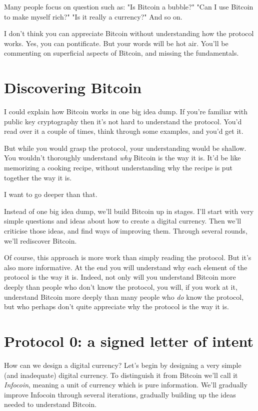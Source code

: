 Many people focus on question such as: "Is Bitcoin a bubble?"  "Can I
use Bitcoin to make myself rich?"  "Is it really a currency?" And so
on.

I don't think you can appreciate Bitcoin without understanding how the
protocol works.  Yes, you can pontificate.  But your words will be hot
air.  You'll be commenting on superficial aspects of Bitcoin, and
missing the fundamentals.

\section{Discovering Bitcoin}

I could explain how Bitcoin works in one big idea dump.  If you're
familiar with public key cryptography then it's not hard to understand
the protocol.  You'd read over it a couple of times, think through
some examples, and you'd get it.

But while you would grasp the protocol, your understanding would be
shallow.  You wouldn't thoroughly understand \emph{why} Bitcoin is the
way it is.  It'd be like memorizing a cooking recipe, without
understanding why the recipe is put together the way it is.

I want to go deeper than that.

Instead of one big idea dump, we'll build Bitcoin up in stages.  I'll
start with very simple questions and ideas about how to create a
digital currency.  Then we'll criticise those ideas, and find ways of
improving them.  Through several rounds, we'll rediscover Bitcoin.

Of course, this approach is more work than simply reading the
protocol.  But it's also more informative.  At the end you will
understand why each element of the protocol is the way it is.  Indeed,
not only will you understand Bitcoin more deeply than people who don't
know the protocol, you will, if you work at it, understand Bitcoin
more deeply than many people who \emph{do} know the protocol, but who
perhaps don't quite appreciate why the protocol is the way it is.

\section{Protocol 0: a signed letter of intent}

How can we design a digital currency?  Let's begin by designing a very
simple (and inadequate) digital currency.  To distinguish it from
Bitcoin we'll call it \emph{Infocoin}, meaning a unit of currency
which is pure information.  We'll gradually improve Infocoin through
several iterations, gradually building up the ideas needed to
understand Bitcoin.

